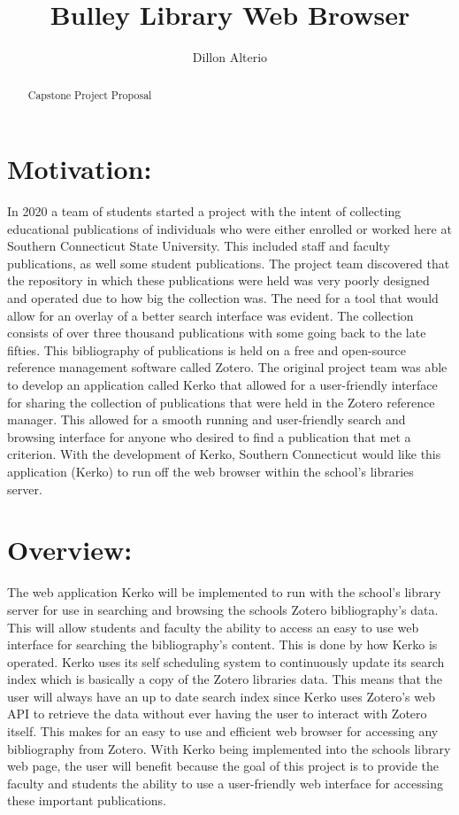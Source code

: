 \documentclass[12pt]{article}
\title{Bulley Library Web Browser}
\author{Dillon Alterio}
\begin{document}
\maketitle

\begin{abstract}
Capstone Project Proposal
\end{abstract}

\section{Motivation:}

In 2020 a team of students started a project with the intent of collecting educational publications of individuals who were either enrolled or worked here at Southern Connecticut State University.  This included staff and faculty publications, as well some student publications.  The project team discovered that the repository in which these publications were held was very poorly designed and operated due to how big the collection was.  The need for a tool that would allow for an overlay of a better search interface was evident.  The collection consists of over three thousand publications with some going back to the late fifties. This bibliography of publications is held on a free and open-source reference management software called Zotero.  The original project team was able to develop an application called Kerko that allowed for a user-friendly interface for sharing the collection of publications that were held in the Zotero reference manager.  This allowed for a smooth running and user-friendly search and browsing interface for anyone who desired to find a publication that met a criterion.  With the development of Kerko, Southern Connecticut would like this application (Kerko) to run off the web browser within the school’s libraries server.   

\section{Overview:}

The web application Kerko will be implemented to run with the school’s library server for use in searching and browsing the schools Zotero bibliography’s data.  This will allow students and faculty the ability to access an easy to use web interface for searching the bibliography’s content.  This is done by how Kerko is operated.  Kerko uses its self scheduling system to continuously update its search index which is basically a copy of the Zotero libraries data.   This means that the user will always have an up to date search index since Kerko uses Zotero’s web API to retrieve the data without ever having the user to interact with Zotero itself.   This makes for an easy to use and efficient web browser for accessing any bibliography from Zotero.  With Kerko being implemented into the schools library web page, the user will benefit because the goal of this project is to provide the faculty and students the ability to use a user-friendly web interface for accessing these important publications.  
\end{document}
